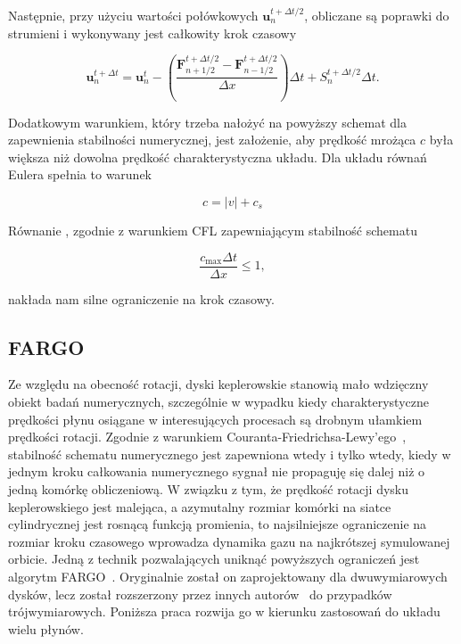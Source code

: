 Następnie, przy użyciu wartości połówkowych $\mathbf{u}^{t+\Delta t/2}_{n}$,
obliczane są poprawki do strumieni i wykonywany jest całkowity krok czasowy

\begin{equation}
   \mathbf{u}^{t+\Delta t}_{n} = \mathbf{u}^{t}_{n} -
   \left(\frac{\mathbf{F}^{t+\Delta t/2}_{n+1/2} - \mathbf{F}^{t+\Delta
   t/2}_{n-1/2}}{\Delta x} \right)\Delta t + S_n^{t+\Delta t/2}\Delta t.
\end{equation}

Dodatkowym warunkiem, który trzeba nałożyć na powyższy schemat dla zapewnienia
stabilności numerycznej, jest założenie, aby prędkość mrożąca $c$ była większa
niż dowolna prędkość charakterystyczna układu. Dla układu równań Eulera spełnia
to warunek

\begin{equation}\label{fs}
   c = |v| + c_s
\end{equation}

Równanie , zgodnie z warunkiem CFL zapewniającym stabilność schematu

\begin{equation}\label{cfl}
   \frac{c_{\textrm{max}}\Delta t}{\Delta x} \le 1,
\end{equation}

nakłada nam silne ograniczenie na krok czasowy. 

\subsection{FARGO}
Ze względu na obecność rotacji, dyski keplerowskie stanowią mało wdzięczny
obiekt badań numerycznych, szczególnie w wypadku kiedy charakterystyczne
prędkości płynu osiągane w interesujących procesach są drobnym ułamkiem
prędkości rotacji. Zgodnie z warunkiem Couranta-Friedrichsa-Lewy'ego~\cite{cir},
stabilność schematu numerycznego jest zapewniona wtedy i tylko wtedy, kiedy w
jednym kroku całkowania numerycznego sygnał nie propaguję się dalej niż o jedną
komórkę obliczeniową. W związku z tym, że prędkość rotacji dysku keplerowskiego
jest malejąca, a azymutalny rozmiar komórki na siatce cylindrycznej jest rosnącą
funkcją promienia, to najsilniejsze ograniczenie na rozmiar kroku czasowego
wprowadza dynamika gazu na najkrótszej symulowanej orbicie. Jedną z technik
pozwalających uniknąć powyższych ograniczeń jest algorytm FARGO~\citep{M00}.
Oryginalnie został on zaprojektowany dla dwuwymiarowych dysków, lecz został
rozszerzony przez innych autorów~\cite{KBK09} do przypadków trójwymiarowych.
Poniższa praca rozwija go w kierunku zastosowań do układu wielu płynów.

